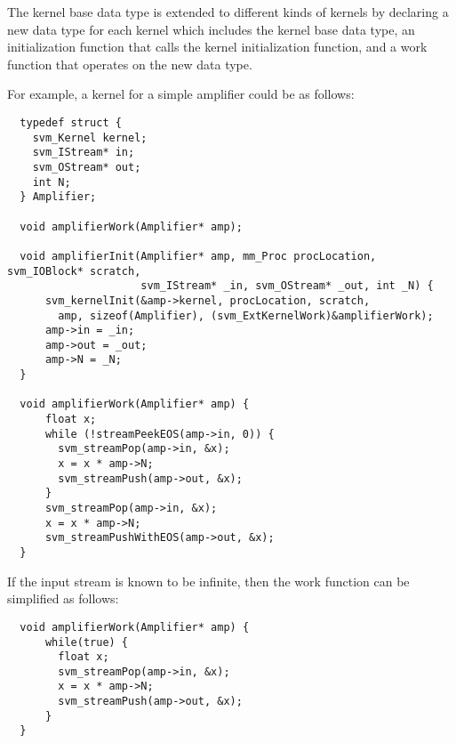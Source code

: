 The kernel base data type is extended to different kinds of kernels by
declaring a new data type for each kernel which includes the kernel
base data type, an initialization function that calls the kernel
initialization function, and a work function that operates on the new
data type.

For example, a kernel for a simple amplifier could be as follows:
 
{\small
\begin{verbatim}
  typedef struct {
    svm_Kernel kernel;
    svm_IStream* in;
    svm_OStream* out;
    int N;
  } Amplifier;

  void amplifierWork(Amplifier* amp);

  void amplifierInit(Amplifier* amp, mm_Proc procLocation, svm_IOBlock* scratch, 
                     svm_IStream* _in, svm_OStream* _out, int _N) {
      svm_kernelInit(&amp->kernel, procLocation, scratch, 
        amp, sizeof(Amplifier), (svm_ExtKernelWork)&amplifierWork);
      amp->in = _in;
      amp->out = _out;
      amp->N = _N;
  }
 
  void amplifierWork(Amplifier* amp) {
      float x;
      while (!streamPeekEOS(amp->in, 0)) {
        svm_streamPop(amp->in, &x);
        x = x * amp->N;
        svm_streamPush(amp->out, &x);
      }
      svm_streamPop(amp->in, &x);
      x = x * amp->N;
      svm_streamPushWithEOS(amp->out, &x);
  }
\end{verbatim}}

\noindent If the input stream is known to be infinite, then the work
function can be simplified as follows:

{\small
\begin{verbatim}
  void amplifierWork(Amplifier* amp) {
      while(true) {
        float x;
        svm_streamPop(amp->in, &x);
        x = x * amp->N;
        svm_streamPush(amp->out, &x);
      }
  }
\end{verbatim}}

